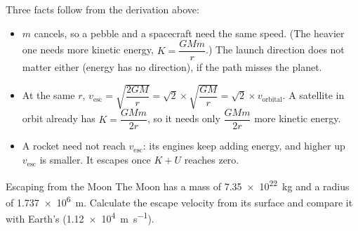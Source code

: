 Three facts follow from the derivation above:
\begin{itemize}
  \item $m$ cancels, so a pebble and a spacecraft need the same speed. (The
        heavier one needs more kinetic energy, $K = \dfrac{GMm}{r}$.) The launch
        direction does not matter either (energy has no direction), if the path
        misses the planet.
  \item At the same $r$,
        $v_\mathrm{esc} = \sqrt{\dfrac{2GM}{r}} = \sqrt{2}\times\sqrt{\dfrac{GM}{r}}
        = \sqrt{2}\times v_\text{orbital}$. A satellite in orbit already has
        $K = \dfrac{GMm}{2r}$, so it needs only $\dfrac{GMm}{2r}$ more kinetic
        energy.
  \item A rocket need not reach $v_\mathrm{esc}$: its engines keep adding energy,
        and higher up $v_\mathrm{esc}$ is smaller. It escapes once $K + U$ reaches zero.
\end{itemize}

\begin{workedexample}{Escaping from the Moon}\label{ch5:we:moon}
The Moon has a mass of \qty{7.35e22}{kg} and a radius of \qty{1.737e6}{m}.
Calculate the escape velocity from its surface and compare it with Earth's
(\qty{1.12e4}{m.s^{-1}}).
\end{workedexample}

